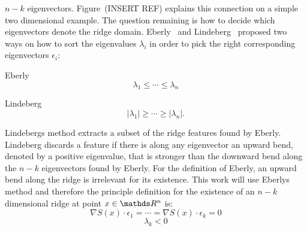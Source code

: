$n-k$ eigenvectors. Figure~(INSERT REF) explains this connection on a
simple two dimensional example. The question remaining is how to decide
which eigenvectors denote the ridge domain. Eberly~\cite{Eberly} and
Lindeberg~\cite{Lindeberg} proposed two ways on how to sort the
eigenvalues $\lambda_i$ in order to pick the right corresponding
eigenvectors $\epsilon_i$:\\
\begin{inparaenum}[]
  \item Eberly
  \begin{equation}\label{eq:Eberly}
   \lambda_1 \leq \cdots \leq \lambda_n
  \end{equation}
  \item Lindeberg
  \begin{equation}
    \lvert \lambda_1 \rvert \geq \cdots \geq \lvert \lambda_n \rvert.
  \end{equation}
\end{inparaenum}
\noindent Lindebergs method extracts a subset of the ridge features
found by Eberly. Lindeberg discards a feature if there is along any
eigenvector an upward bend, denoted by a positive eigenvalue, that is
stronger than the downward bend along the $n-k$ eigenvectors found by
Eberly. For the definition of Eberly, an upward bend along the ridge is
irrelevant for its existence. This work will use Eberlys method and
therefore the principle definition for the existence of an $n-k$
dimensional ridge at point $x \in \real^n$ is:\\

\begin{equation}\label{eq:ridgeDot}
  \nabla S(x) \cdot \epsilon_1 = \cdots = \nabla S(x) \cdot \epsilon_{k} = 0
\end{equation}
\begin{equation}\label{eq:ridgeEV}
  \lambda_k < 0
\end{equation}

